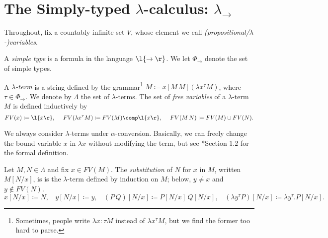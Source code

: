 \documentclass[reqno]{amsart}
\begin{document}
    \section{The Simply-typed $\lambda$-calculus: $\lambda_\rightarrow$}

    Throughout, fix a countably infinite set $V$, whose element we call \textit{(propositional/$\lambda$-)variables}.

    \begin{definition}
        A \textit{simple type} is a formula in the language $\l\{\rightarrow\r\}$. We let $\Phi_\rightarrow$ denote the set of simple types.
    \end{definition}

    \begin{definition}
        A \textit{$\lambda$-term} is a string defined by the grammar\footnote{Sometimes, people write $\lambda x:\tau M$ instead of $\lambda x^\tau M$, but we find the former too hard to parse.} $M\coloneqq x\,|\,M\,M\,|\,(\lambda x^\tau M)$, where $\tau\in\Phi_\rightarrow$. We denote by $\Lambda$ the set of $\lambda$-terms. The set of \textit{free variables} of a $\lambda$-term $M$ is defined inductively by
        \begin{equation*}
            FV(x)\coloneqq\l\{x\r\},\ \ \ \ FV(\lambda x^\tau M)\coloneqq FV(M)\comp\l\{x\r\},\ \ \ \ FV(M\,N)\coloneqq FV(M)\cup FV(N).
        \end{equation*}
    \end{definition}

    \begin{remark}
        We always consider $\lambda$-terms under $\alpha$-conversion. Basically, we can freely change the bound variable $x$ in $\lambda x$ without modifying the term, but see \cite{SU06}*{Section 1.2} for the formal definition.
    \end{remark}

    \begin{definition}
        Let $M,N\in\Lambda$ and fix $x\in FV(M)$. The \textit{substitution} of $N$ for $x$ in $M$, written $M[N/x]$, is is the $\lambda$-term defined by induction on $M$; below, $y\neq x$ and $y\not\in FV(N)$.
        \begin{equation*}
            x[N/x]\coloneqq N,\ \ \ \ y[N/x]\coloneqq y,\ \ \ \ (P\,Q)[N/x]\coloneqq P[N/x]\,Q[N/x],\ \ \ \ (\lambda y^\tau P)[N/x]\coloneqq\lambda y^\tau.P[N/x].
        \end{equation*}
    \end{definition}
\end{document}
